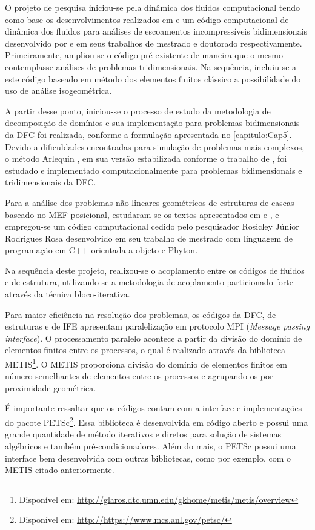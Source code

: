 \documentclass[tese_patricia.tex]{subfiles}
\begin{document}
O projeto de pesquisa iniciou-se pela dinâmica dos fluidos computacional tendo como base os desenvolvimentos realizados em  e 
um código computacional de dinâmica dos fluidos para análises de escoamentos incompressíveis bidimensionais desenvolvido por  e  em seus trabalhos de mestrado e doutorado respectivamente. Primeiramente, ampliou-se o código pré-existente de maneira que o mesmo contemplasse análises de problemas tridimensionais. Na sequência, incluiu-se a este código baseado em método dos elementos finitos clássico a possibilidade do uso de análise isogeométrica.

A partir desse ponto, iniciou-se o processo de estudo da metodologia de decomposição de domínios e sua implementação para problemas bidimensionais da DFC foi realizada, conforme a formulação apresentada no \autoref{capitulo:Cap5}. Devido a dificuldades encontradas para simulação de problemas mais complexos, o método Arlequin \cite{Dhia:1998}, em sua versão estabilizada conforme o trabalho de , foi estudado e implementado computacionalmente para problemas bidimensionais e tridimensionais da DFC.

Para a análise dos problemas não-lineares geométricos de estruturas de cascas baseado no MEF posicional, estudaram-se os textos apresentados em  e , e empregou-se um código computacional cedido pelo pesquisador Rosicley Júnior Rodrigues Rosa desenvolvido em seu trabalho de mestrado  \cite{Rosa:2021} com linguagem de programação em C++ orientada a objeto e Phyton.

Na sequência deste projeto, realizou-se o acoplamento entre os códigos de fluidos e de estrutura, utilizando-se a metodologia de acoplamento particionado forte através da técnica bloco-iterativa.

Para maior eficiência na resolução dos problemas, os códigos da DFC, de estruturas e de IFE apresentam paralelização em protocolo MPI (\textit{Message passing interface}). O processamento paralelo acontece a partir da divisão do domínio de elementos finitos entre os processos, o qual é realizado através da biblioteca METIS\footnote{Disponível em: \url{http://glaros.dtc.umn.edu/gkhome/metis/metis/overview}}. O METIS proporciona divisão do domínio de elementos finitos em número semelhantes de elementos entre os processos e agrupando-os por proximidade geométrica.

É importante ressaltar que os códigos contam com a interface e implementações do pacote PETSc\footnote{Disponível em: \url{http://https://www.mcs.anl.gov/petsc/}}. Essa biblioteca é desenvolvida em código aberto e possui uma grande quantidade de método iterativos e diretos para solução de sistemas algébricos e também pré-condicionadores. Além do mais, o PETSc possui uma interface bem desenvolvida com outras bibliotecas, como por exemplo, com o METIS citado anteriormente. 
\end{document}
